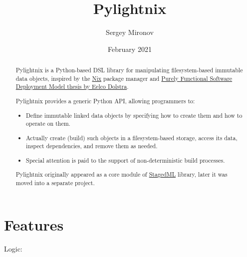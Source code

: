 \documentclass{article}
\begin{document}
\newenvironment{shellcode}
  {\VerbatimEnvironment\begin{verbatim}}
  {\end{verbatim}}
\newenvironment{pythoncode}
  {\VerbatimEnvironment\begin{verbatim}}
  {\end{verbatim}}


\title{Pylightnix}
\author{Sergey Mironov}
\date{February 2021}
\maketitle


\begin{abstract}

Pylightnix is a Python-based DSL library for manipulating filesystem-based
immutable data objects, inspired by the \href{https://nixos.org}{Nix} package
manager and \href{https://edolstra.github.io/pubs/phd-thesis.pdf}{Purely
Functional Software Deployment Model thesis by Eelco Dolstra}.

Pylightnix provides a generic Python API, allowing programmers to:
\begin{itemize}
  \item Define immutable linked data objects by specifying how to create them
    and how to operate on them.
  \item Actually create (build) such objects in a filesystem-based storage,
    access its data, inspect dependencies, and remove them as needed.
  \item Special attention is paid to the support of non-deterministic build
    processes.
\end{itemize}

Pylightnix originally appeared as a core module of
\href{https://github.com/stagedml/stagedml}{StagedML} library, later it was
moved into a separate project.

\end{abstract}


\section{Features}

Logic:
\end{document}
